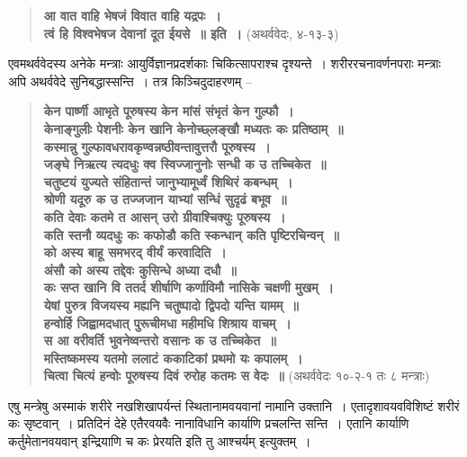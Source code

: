 \begin{verse}
\textbf{आ वात वाहि भेषजं विवात वाहि यद्रपः~।}\\
\textbf{त्वं हि विश्वभेषज देवानां दूत ईयसे~॥ इति~।} (अथर्ववेदः, ४-१३-३)
\end{verse}

एवमथर्ववेदस्य अनेके मन्त्राः आयुर्विज्ञानप्रदर्शकाः चिकित्सापराश्च दृश्यन्ते~। शरीररचनावर्णनपराः मन्त्राः अपि अथर्ववेदे सुनिबद्धास्सन्ति~। तत्र किञ्चिदुदाहरणम् –

\begin{verse}
\textbf{केन पार्ष्णी आभृते पूरुषस्य केन मांसं संभृतं केन गुल्फौ~।}\\
\textbf{केनाङ्गुलीः पेशनीः केन खानि केनोच्छ्लङ्खौ मध्यतः कः प्रतिष्ठाम्~॥}\\
\textbf{कस्मान्नु गुल्फावधरावकृण्वन्नष्ठीवन्तावुत्तरौ पूरुषस्य~।}\\
\textbf{जङ्घे निऋत्य त्यदधुः क्व स्विज्जानुनोः सन्धी क उ तच्चिकेत~॥}\\
\textbf{चतुष्टयं युज्यते संहितान्तं जानुभ्यामूर्ध्वं शिथिरं कबन्धम्~।}\\
\textbf{श्रोणी यदूरु क उ तज्जजान याभ्यां सन्धिं सुदृढं बभूव~॥}\\
\textbf{कति देवाः कतमे त आसन् उरो ग्रीवाश्चिक्युः पूरुषस्य~।}\\
\textbf{कति स्तनौ व्यदधुः कः कफोडौ कति स्कन्धान् कति पृष्टिरचिन्वन्~॥}\\
\textbf{को अस्य बाहू समभरद् वीर्यं करवादिति~।}\\
\textbf{अंसौ को अस्य तद्देवः कुसिन्धे अध्या दधौ~॥}\\
\textbf{कः सप्त खानि वि ततर्द शीर्षाणि कर्णाविमौ नासिके चक्षणी मुखम्~।}\\
\textbf{येषां पुरुत्र विजयस्य मह्यनि चतुष्पादो द्विपदो यन्ति यामम्~॥}\\
\textbf{हन्वोर्हि जिह्वामदधात् पुरूचीमधा महीमधि शिश्राय वाचम्~।}\\
\textbf{स आ वरीवर्ति भुवनेष्वन्तरो वसानः क उ तच्चिकेत~॥}\\
\textbf{मस्तिष्कमस्य यतमो ललाटं ककाटिकां प्रथमो यः कपालम्~।}\\
\textbf{चित्वा चित्यं हन्वोः पूरुषस्य दिवं रुरोह कतमः स वेदः~॥} (अथर्ववेदः १०-२-१ तः ८ मन्त्राः)
\end{verse}

एषु मन्त्रेषु अस्माकं शरीरे नखशिखापर्यन्तं स्थितानामवयवानां नामानि उक्तानि~। एतादृशावयवविशिष्टं शरीरं कः सृष्टवान्~। प्रतिदिनं देहे एतैरवयवैः नानाविधानि कार्याणि प्रचलन्ति सन्ति~। एतानि कार्याणि कर्तुमेतानवयवान् इन्द्रियाणि च कः प्रेरयति इति तु आश्चर्यम् इत्युक्तम्~।


